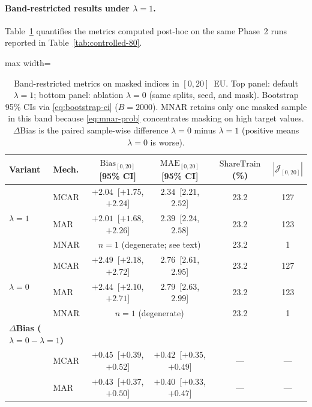 \paragraph{Band-restricted results under $\lambda{=}1$.}
Table~\ref{tab:bias-band} quantifies the metrics computed post-hoc on the same Phase~2 runs reported in Table~\ref{tab:controlled-80}.

\begin{table}[ht]
\centering
\caption{Band-restricted metrics on masked indices in $[0,20]$~EU. Top panel: default $\lambda{=}1$; bottom panel: ablation $\lambda{=}0$ (same splits, seed, and mask). Bootstrap 95\% CIs via \eqref{eq:bootstrap-ci} ($B{=}2000$). MNAR retains only one masked sample in this band because \eqref{eq:mnar-prob} concentrates masking on high target values. $\Delta$Bias is the paired sample-wise difference $\lambda{=}0$ minus $\lambda{=}1$ (positive means $\lambda{=}0$ is worse).}
\label{tab:bias-band}
\small
\begin{adjustbox}{max width=\linewidth}
\begin{tabular}{llcccc}
\toprule
\textbf{Variant} & \textbf{Mech.} & \textbf{$\mathrm{Bias}_{[0,20]}$ [95\% CI]} & \textbf{$\mathrm{MAE}_{[0,20]}$ [95\% CI]} & \textbf{$\mathrm{ShareTrain}$ (\%)} & $|\mathcal{J}_{[0,20]}|$ \\
\midrule
\multirow{3}{*}{$\lambda{=}1$}
 & MCAR & $+2.04$\ [$+1.75$, $+2.24$] & $2.34$\ [$2.21$, $2.52$] & 23.2 & 127 \\
 & MAR  & $+2.01$\ [$+1.68$, $+2.26$] & $2.39$\ [$2.24$, $2.58$] & 23.2 & 123 \\
 & MNAR & \multicolumn{2}{c}{$n{=}1$ (degenerate; see text)} & 23.2 & 1 \\
\midrule
\multirow{3}{*}{$\lambda{=}0$}
 & MCAR & $+2.49$\ [$+2.18$, $+2.72$] & $2.76$\ [$2.61$, $2.95$] & 23.2 & 127 \\
 & MAR  & $+2.44$\ [$+2.10$, $+2.71$] & $2.79$\ [$2.63$, $2.99$] & 23.2 & 123 \\
 & MNAR & \multicolumn{2}{c}{$n{=}1$ (degenerate)} & 23.2 & 1 \\
\midrule
\multicolumn{2}{l}{\textbf{$\Delta$Bias ($\lambda{=}0 - \lambda{=}1$)}}  \\
 & MCAR & $+0.45$\ [$+0.39$, $+0.52$] & $+0.42$\ [$+0.35$, $+0.49$] & --- & --- \\
 & MAR  & $+0.43$\ [$+0.37$, $+0.50$] & $+0.40$\ [$+0.33$, $+0.47$] & --- & --- \\
\bottomrule
\end{tabular}
\end{adjustbox}
\end{table}

